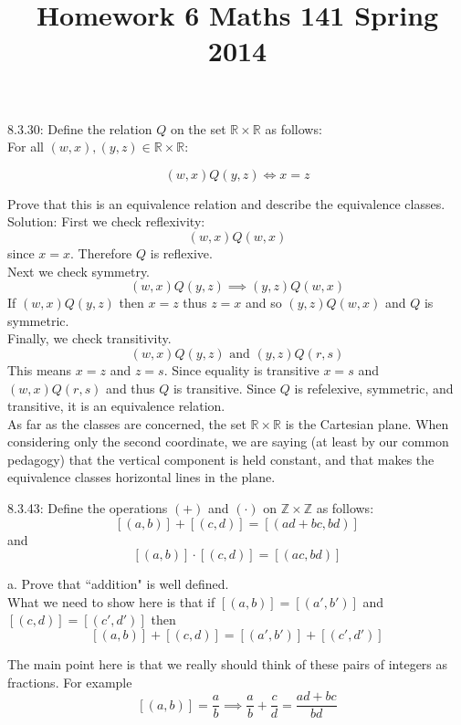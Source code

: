 \documentclass[16 pt]{amsart}
\theoremstyle{definition}
\theoremstyle{remark}
\numberwithin{equation}{subsection}
\newcommand{\R}{\mathbb{R}}
\newcommand{\Z}{\mathbb{Z}}
\begin{document}
\title{Homework 6 Maths 141 Spring 2014}
\maketitle 


8.3.30:  Define the relation $Q$ on the set $\R\times\R$ as follows:\\
For all $(w,x),(y,z)\in\mathbb{R}\times\mathbb{R}$:

\[
(w,x) Q (y,z) \Longleftrightarrow x=z
\]

Prove that this is an equivalence relation and describe the equivalence classes.\\

Solution:  First we check reflexivity:\\
\[
(w,x)Q(w,x) 
\]
since $x=x$. Therefore $Q$ is reflexive.\\
Next we check symmetry.
\[
(w,x)Q(y,z) \implies (y,z)Q(w,x)
\]
If $(w,x)Q(y,z)$ then $x=z$ thus $z=x$ and so $(y,z)Q(w,x)$ and $Q$ is symmetric.\\
Finally, we check transitivity.
\[
(w,x)Q(y,z) \text{ and } (y,z) Q (r,s) 
\]
This means $x=z$ and $z=s$.  Since equality is transitive $x=s$ and $(w,x)Q(r,s)$ and thus $Q$ is transitive.  Since $Q$ is refelexive, symmetric, and transitive, it is an equivalence relation.\\

As far as the classes are concerned, the set $\R\times\R$ is the Cartesian plane.  When considering only the second coordinate, we are saying (at least by our common pedagogy) that the vertical component is held constant, and that makes the equivalence classes horizontal lines in the plane.





\newpage

8.3.43: Define the operations $(+)$ and $(\cdot)$ on $\Z\times\Z$ as follows:
\[
[(a,b)]+[(c,d)] = [(ad+bc,bd)]
\] 
and
\[
[(a,b)]\cdot[(c,d)] = [(ac,bd)]
\]

a. Prove that ``addition" is well defined.\\

What we need to show here is that if $[(a,b)]=[(a',b')]$ and $[(c,d)]=[(c',d')]$ then
\[
[(a,b)]+[(c,d)] = [(a',b')]+[(c',d')]
\]

The main point here is that we really should think of these pairs of integers as fractions.  For example
\[
[(a,b)] = \frac{a}{b} \implies \frac{a}{b}+\frac{c}{d} = \frac{ad+bc}{bd}
\]
\end{document}
